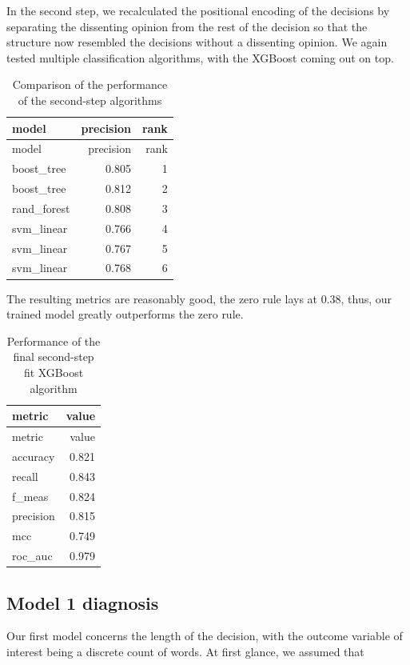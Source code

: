 \documentclass[
  11pt,
]{article}
\begin{document}
In the second step, we recalculated the positional encoding of the
decisions by separating the dissenting opinion from the rest of the
decision so that the structure now resembled the decisions without a
dissenting opinion. We again tested multiple classification algorithms,
with the XGBoost coming out on top.

\begin{longtable}[]{@{}lrr@{}}
\caption{Comparison of the performance of the second-step
algorithms}\tabularnewline
\toprule\noalign{}
model & precision & rank \\
\midrule\noalign{}
\endfirsthead
\toprule\noalign{}
model & precision & rank \\
\midrule\noalign{}
\endhead
\bottomrule\noalign{}
\endlastfoot
boost\_tree & 0.805 & 1 \\
boost\_tree & 0.812 & 2 \\
rand\_forest & 0.808 & 3 \\
svm\_linear & 0.766 & 4 \\
svm\_linear & 0.767 & 5 \\
svm\_linear & 0.768 & 6 \\
\end{longtable}

The resulting metrics are reasonably good, the zero rule lays at 0.38,
thus, our trained model greatly outperforms the zero rule.

\begin{longtable}[]{@{}lr@{}}
\caption{Performance of the final second-step fit XGBoost
algorithm}\tabularnewline
\toprule\noalign{}
metric & value \\
\midrule\noalign{}
\endfirsthead
\toprule\noalign{}
metric & value \\
\midrule\noalign{}
\endhead
\bottomrule\noalign{}
\endlastfoot
accuracy & 0.821 \\
recall & 0.843 \\
f\_meas & 0.824 \\
precision & 0.815 \\
mcc & 0.749 \\
roc\_auc & 0.979 \\
\end{longtable}

\hypertarget{model-1-diagnosis}{%
\subsection{Model 1 diagnosis}\label{model-1-diagnosis}}

Our first model concerns the length of the decision, with the outcome
variable of interest being a discrete count of words. At first glance,
we assumed that
\end{document}
